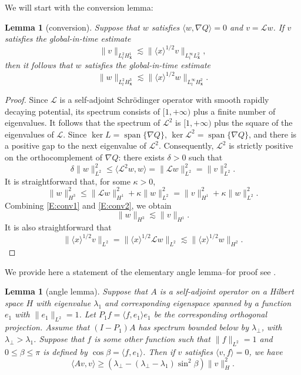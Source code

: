 \documentclass[12pt,letterpaper]{amsart}
\newcommand{\la}{\langle}
\newcommand{\ra}{\rangle}
\newcommand{\spn}{\operatorname{span}}
\newtheorem{lemma}[theorem]{Lemma}
\theoremstyle{remark}
\numberwithin{equation}{section}
\numberwithin{theorem}{section}
\numberwithin{table}{section}
\begin{document}
We will start with the conversion lemma:

\begin{lemma}[conversion]\label{L:conversion}
Suppose that $w$ satisfies  $\la w, \nabla Q \ra =0$
and $v=\mathcal{L}w$.  If $v$ satisfies the global-in-time estimate
$$
\|v \|_{L_t^2 H_\mathbf{x}^1} \lesssim \| \la x \ra^{1/2} v\|_{L_t^\infty L_\mathbf{x}^2},
$$
then it follows that $w$ satisfies the global-in-time estimate
$$
\| w\|_{L_t^2 H_{\mathbf{x}}^3} \lesssim \| \la x \ra^{1/2} w \|_{L_t^\infty H_\mathbf{x}^2}.
$$
\end{lemma}
\begin{proof}
Since $\mathcal{L}$ is a self-adjoint Schr\" odinger operator with smooth rapidly decaying potential, its spectrum consists of $[1,+\infty)$ plus a finite number of eigenvalues.  It follows that the spectrum of $\mathcal{L}^2$ is $[1,+\infty)$ plus the square of the eigenvalues of $\mathcal{L}$.   Since $\ker L = \spn \{ \nabla Q \}$, $\ker \mathcal{L}^2 = \spn \{ \nabla Q \}$, and there is a positive gap to the next eigenvalue of $\mathcal{L}^2$.  Consequently, $\mathcal{L}^2$ is strictly positive on the orthocomplement of $\nabla Q$: there exists $\delta>0$ such that 
\begin{equation}
\label{E:conv1}
 \delta \|w \|_{L^2}^2 \leq  \la \mathcal{L}^2 w, w \ra = \| \mathcal{L}w \|_{L^2}^2 = \| v \|_{L^2}^2.
\end{equation}
It is straightforward that, for some $\kappa>0$,
\begin{equation}
\label{E:conv2}
\| w \|_{H^3}^2 \leq  \| \mathcal{L}w \|_{H^1}^2 + \kappa \| w\|_{L^2}^2 =   \| v \|_{H^1}^2 + \kappa \| w\|_{L^2}^2.
\end{equation}
Combining \eqref{E:conv1} and \eqref{E:conv2}, we obtain
$$
\| w \|_{H^3} \lesssim \| v \|_{H^1}.
$$
It is also straightforward that
$$
\|\la x \ra^{1/2} v \|_{L^2} = \| \la x \ra^{1/2} \mathcal{L} w \|_{L^2}  \lesssim \| \la x \ra^{1/2} w \|_{H^2}.
$$
\end{proof}




We provide here a statement of the elementary angle lemma--for proof see \cite{FHRY}.

\begin{lemma}[angle lemma]
\label{L:angle}
Suppose that $A$ is a self-adjoint operator on a Hilbert space $H$ with eigenvalue $\lambda_1$ and corresponding eigenspace spanned by a  function $e_1$ with $\|e_1\|_{L^2}=1$.  Let $P_1f = \la f,e_1\ra e_1$ be the corresponding orthogonal projection.   Assume that $(I-P_1)A$ has spectrum bounded below by $\lambda_\perp$, with $\lambda_\perp>\lambda_1$.  Suppose that $f$ is some other function such that $\|f\|_{L^2}=1$ and $0 \leq \beta \leq \pi$ is defined by $\cos \beta = \la f, e_1\ra$.   Then if $v$ satisfies $\la v, f \ra =0$, we have
$$
\la Av,v \ra \geq (\lambda_\perp - (\lambda_\perp - \lambda_1)\sin^2\beta)\|v\|_{H}^2.
$$
\end{lemma}
\end{document}
